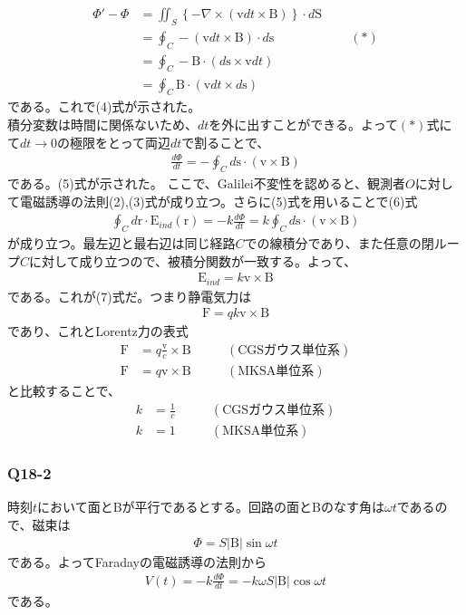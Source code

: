\documentclass[platex,dvipdfmx,a4paper]{jsarticle}
\newcommand{\bbn}[2]{\frac{d #1}{d #2}}
\newcommand{\vect}[1]{\boldsymbol{\mathrm{#1}}}
\begin{document}
  \begin{align*}
    \Phi' - \Phi &= \iint_S \left\{ -\nabla \times (\vect{v}dt \times \vect{B})\right\} \cdot d\vect{S}\\
    &= \oint_C -(\vect{v}dt \times \vect{B}) \cdot d\vect{s} \qquad\qquad\qquad (*)\\
    &= \oint_C -\vect{B} \cdot (d\vect{s} \times \vect{v}dt)\\
    &= \oint_C \vect{B} \cdot (\vect{v}dt \times d\vect{s})
  \end{align*}
  である。これで(4)式が示された。\\
  積分変数は時間に関係ないため、$dt$を外に出すことができる。よって$(*)$式にて$dt\rightarrow 0$の極限をとって両辺$dt$で割ることで、
  \begin{align*}
    \bbn{\Phi}{t} = -\oint_C d\vect{s} \cdot (\vect{v} \times \vect{B})
  \end{align*}
  である。(5)式が示された。
  ここで、Galilei不変性を認めると、観測者$O$に対して電磁誘導の法則(2),(3)式が成り立つ。さらに(5)式を用いることで(6)式
  \begin{align*}
    \oint_C d\vect{r}\cdot\vect{E}_{ind}(\vect{r}) = -k\bbn{\Phi}{t} = k\oint_C d\vect{s}\cdot(\vect{v}\times\vect{B})
  \end{align*}
  が成り立つ。最左辺と最右辺は同じ経路$C$での線積分であり、また任意の閉ループ$C$に対して成り立つので、被積分関数が一致する。よって、
  \begin{align*}
    \vect{E}_{ind} = k\vect{v}\times\vect{B}
  \end{align*}
  である。これが(7)式だ。つまり静電気力は
  \begin{align*}
    \vect{F} = qk\vect{v}\times\vect{B}
  \end{align*}
  であり、これとLorentz力の表式
  \begin{align*}
    \vect{F} &= q\frac{\vect{v}}{c}\times\vect{B} \qquad &(\mathrm{CGS}ガウス単位系)\\
    \vect{F} &= q\vect{v}\times\vect{B} \qquad &(\mathrm{MKSA}単位系)
  \end{align*}
  と比較することで、
  \begin{align*}
    k&=\frac{1}{c} \qquad &(\mathrm{CGS}ガウス単位系)\\
    k&=1 &(\mathrm{MKSA}単位系)
  \end{align*}




  \subsubsection*{Q18-2}
  時刻$t$において面と$\vect{B}$が平行であるとする。回路の面と$\vect{B}$のなす角は$\omega t$であるので、磁束は
  \begin{align*}
    \Phi = S|\vect{B}|\sin{\omega t}
  \end{align*}
  である。よってFaradayの電磁誘導の法則から
  \begin{align*}
    V(t) = -k\bbn{\Phi}{t} = -k\omega S|\vect{B}|\cos{\omega t}
  \end{align*}
  である。
  
\end{document}
